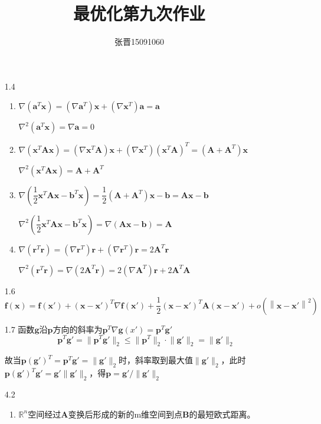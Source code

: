 \documentclass[UTF8]{ctexart}
\title{\heiti 最优化第九次作业}
\author{\kaishu 张晋15091060}
\begin{document}
\maketitle
\begin{enumerate}
\item[1.4]
\begin{enumerate}
\item $\nabla (\bm{a}^T\bm{x})=(\nabla \bm{a}^T)\bm{x}+(\nabla \bm{x}^T)\bm{a}=\bm{a}$

$\nabla ^2(\bm{a}^T\bm{x})=\nabla \bm{a}=0$

\item $\nabla (\bm{x}^T\bm{A}\bm{x})=(\nabla \bm{x}^T\bm{A})\bm{x}+(\nabla \bm{x}^T)(\bm{x}^T\bm{A})^T=(\bm{A}+\bm{A}^T)\bm{x}$

$\nabla ^2(\bm{x}^T\bm{A}\bm{x})=\bm{A}+\bm{A}^T$

\item $\nabla (\dfrac{1}{2}\bm{x}^T\bm{A}\bm{x}-\bm{b}^T\bm{x})=\dfrac{1}{2}(\bm{A}+\bm{A}^T)\bm{x}-\bm{b}=\bm{A}\bm{x}-\bm{b}$

 $\nabla^2(\dfrac{1}{2}\bm{x}^T\bm{A}\bm{x}-\bm{b}^T\bm{x})=\nabla(\bm{A}\bm{x}-\bm{b})=\bm{A}$
 
\item $\nabla (\bm{r}^T\bm{r})=(\nabla \bm{r}^T)\bm{r}+(\nabla \bm{r}^T)\bm{r}=2\bm{A}^T\bm{r}$

$\nabla^2 (\bm{r}^T\bm{r})=\nabla(2\bm{A}^T\bm{r})=2(\nabla \bm{A}^T)\bm{r}+2\bm{A}^T\bm{A}$
\end{enumerate}

\item[1.6]
\begin{equation}
\bm{f}(\bm{x})=\bm{f}(\bm{x'})+
(\bm{x}-\bm{x}')^T\nabla \bm{f}(\bm{x}')+\dfrac{1}{2}(\bm{x}-\bm{x}')^T\bm{A}(\bm{x}-\bm{x}')+o(\left \| \bm{x}-\bm{x}'\right\|^2)
\end{equation}

\item[1.7]
函数$\bm{g}$沿$\bm{p}$方向的斜率为$\bm{p}^T\nabla \bm{g}(x')=\bm{p}^T\bm{g}'$
\[\bm{p}^T\bm{g}'=\big \|\bm{p}^T\bm{g}'\big\|_2\leq \big\|\bm{p}^T\big\|_2\cdot \big\|\bm{g}'\big\|_2=\big\|\bm{g}'\big\|_2\]

故当$\bm{p}(\bm{g}')^T=\bm{p}^T\bm{g}'= \big\|\bm{g}'\big\|_2$时，斜率取到最大值$\big\|\bm{g}'\big\|_2$，此时$\bm{p}(\bm{g}')^T\bm{g}'=\bm{g}'\big\|\bm{g}'\big\|_2$，得$\bm{p}=\bm{g}'/\big\|\bm{g}'\big\|_2$

\newpage
\item[4.2]
\begin{enumerate}
\item $\mathbb{R}^n$空间经过$\bm{A}$变换后形成的新的m维空间到点$\bm{B}$的最短欧式距离。


\end{enumerate}
\end{enumerate}
\end{document}
